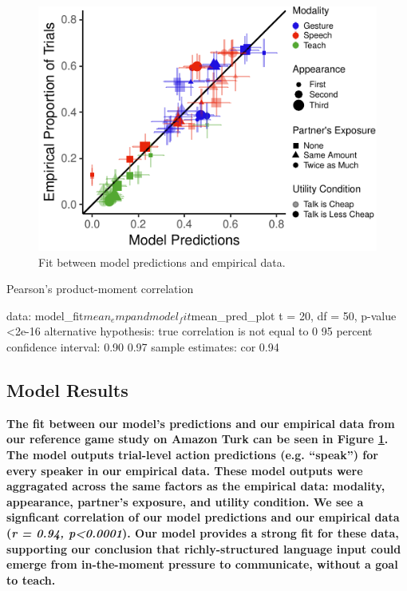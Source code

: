 \documentclass[10pt, letterpaper]{article}
\newenvironment{CodeChunk}{}{}
\begin{document}
\begin{CodeChunk}
\begin{figure}[H]

{\centering \includegraphics{figs/model_fit-1} 

}

\caption[Fit between model predictions and empirical data]{Fit between model predictions and empirical data.}\label{fig:model_fit}
\end{figure}
\begin{CodeOutput}

    Pearson's product-moment correlation

data:  model_fit$mean_emp and model_fit$mean_pred_plot
t = 20, df = 50, p-value <2e-16
alternative hypothesis: true correlation is not equal to 0
95 percent confidence interval:
 0.90 0.97
sample estimates:
 cor 
0.94 
\end{CodeOutput}
\end{CodeChunk}

\subsection{Model Results}\label{model-results}

\textbf{The fit between our model's predictions and our empirical data
from our reference game study on Amazon Turk can be seen in Figure
\ref{fig:model_fit}. The model outputs trial-level action predictions
(e.g. ``speak'') for every speaker in our empirical data. These model
outputs were aggragated across the same factors as the empirical data:
modality, appearance, partner's exposure, and utility condition. We see
a signficant correlation of our model predictions and our empirical data
(\emph{r = 0.94, p\textless{}0.0001}). Our model provides a strong fit
for these data, supporting our conclusion that richly-structured
language input could emerge from in-the-moment pressure to communicate,
without a goal to teach. }
\end{document}
